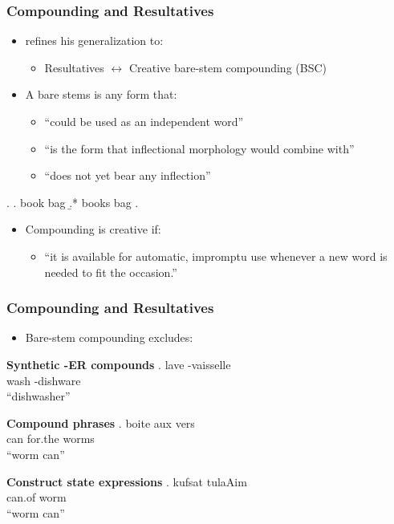 \documentclass[Proposal]{subfiles}
\begin{document}
\begin{frame}
  \frametitle{Compounding and Resultatives}
  \begin{itemize}
    \item \textcite{snyder2016compound} refines his generalization to:
      \begin{itemize}
	\item Resultatives $\leftrightarrow$ Creative bare-stem compounding (BSC)
      \end{itemize}
      \pause
    \item A bare stems is any form that:
      \begin{itemize}
	\item ``could be used as an independent word''
	\item ``is the  form that inflectional morphology would combine with''
	\item ``does not yet bear any inflection'' \hfill\parencite{snyder2016compound}
      \end{itemize}
  \end{itemize}
  \ex. 
  \a. {\rm book bag}
  \b.* {\rm books bag}
  \z.

  \begin{itemize}
      \pause
    \item Compounding is creative if:
      \begin{itemize}
	\item ``it is available for automatic, impromptu use whenever a new word is needed to fit the occasion.'' \parencite{snyder2016compound}
      \end{itemize}
  \end{itemize}
\end{frame}
\begin{frame}
  \frametitle{Compounding and Resultatives}
  \begin{itemize}
    \item Bare-stem compounding excludes:
  \end{itemize}
  \begin{overprint}
    \textbf{Synthetic -ER compounds}
    \exg. lave -vaisselle \parencite[French,][]{snyder2016compound}\\
    wash -dishware\\
    ``dishwasher'' 

    \textbf{Compound phrases}
    \exg. boite aux vers \parencite[French,][]{snyder2016compound}\\
    can for.the worms\\
    ``worm can''

    \textbf{Construct state expressions}
    \exg. kufsat tulaAim \parencite[Hebrew,][]{snyder2016compound}\\
    can.of worm\\
    ``worm can''

  \end{overprint}
\end{frame}
\end{document}
